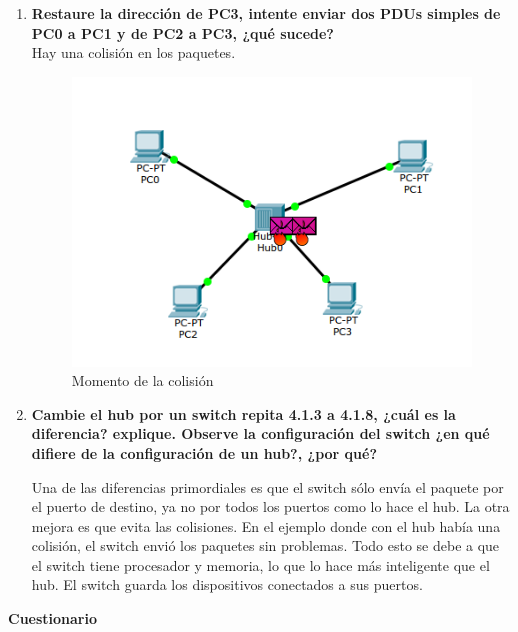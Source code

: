 \documentclass[a4paper,12pt]{article}
\begin{document}
\begin{enumerate}
 \item \textbf{Restaure la dirección de PC3, intente enviar dos PDUs simples de PC0 a PC1 y de PC2 a PC3, ¿qué sucede?} \\
 Hay una colisión en los paquetes.
 \begin{figure}[H]
  \centering
  \includegraphics[scale = 0.5]{14.png}
  \caption{Momento de la colisión}
 \end{figure}
 
 \item \textbf{Cambie el hub por un switch repita 4.1.3 a 4.1.8, ¿cuál es la diferencia? explique. Observe la configuración del switch ¿en qué difiere de la configuración de un hub?, ¿por qué?}
 
 Una de las diferencias primordiales es que el switch sólo envía el paquete por el puerto de destino, ya no por todos los puertos como lo hace el hub.
 La otra mejora es que evita las colisiones. En el ejemplo donde con el hub había una colisión, el switch envió los paquetes sin problemas.
 Todo esto se debe a que el switch tiene procesador y memoria, lo que lo hace más inteligente que el hub. El switch guarda los dispositivos conectados
 a sus puertos.
\end{enumerate}


\begin{large}
 \textbf{Cuestionario}
\end{large}
\end{document}

